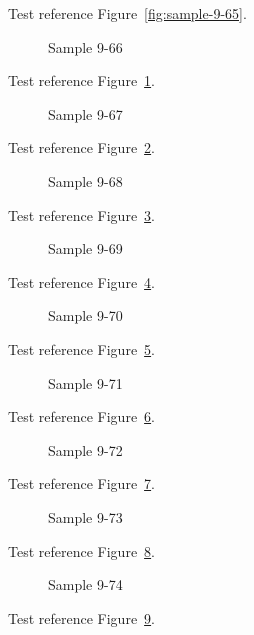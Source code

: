 Test reference Figure~\ref{fig:sample-9-65}.

\begin{figure}[tbhp]
\caption{Sample 9-66}
\label{fig:sample-9-66}
\end{figure}

Test reference Figure~\ref{fig:sample-9-66}.

\begin{figure}[tbhp]
\caption{Sample 9-67}
\label{fig:sample-9-67}
\end{figure}

Test reference Figure~\ref{fig:sample-9-67}.

\begin{figure}[tbhp]
\caption{Sample 9-68}
\label{fig:sample-9-68}
\end{figure}

Test reference Figure~\ref{fig:sample-9-68}.

\begin{figure}[tbhp]
\caption{Sample 9-69}
\label{fig:sample-9-69}
\end{figure}

Test reference Figure~\ref{fig:sample-9-69}.

\begin{figure}[tbhp]
\caption{Sample 9-70}
\label{fig:sample-9-70}
\end{figure}

Test reference Figure~\ref{fig:sample-9-70}.

\begin{figure}[tbhp]
\caption{Sample 9-71}
\label{fig:sample-9-71}
\end{figure}

Test reference Figure~\ref{fig:sample-9-71}.

\begin{figure}[tbhp]
\caption{Sample 9-72}
\label{fig:sample-9-72}
\end{figure}

Test reference Figure~\ref{fig:sample-9-72}.

\begin{figure}[tbhp]
\caption{Sample 9-73}
\label{fig:sample-9-73}
\end{figure}

Test reference Figure~\ref{fig:sample-9-73}.

\begin{figure}[tbhp]
\caption{Sample 9-74}
\label{fig:sample-9-74}
\end{figure}

Test reference Figure~\ref{fig:sample-9-74}.

